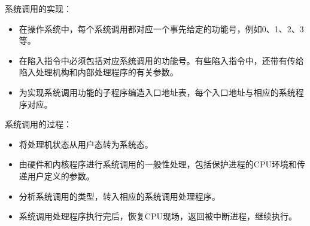 \documentclass[12pt, a4paper, oneside]{ctexart}
\begin{document}
系统调用的实现：
\begin{itemize}
    \item 在操作系统中，每个系统调用都对应一个事先给定的功能号，例如0、1、2、3等。
    \item 在陷入指令中必须包括对应系统调用的功能号。有些陷入指令中，还带有传给陷入处理机构和内部处理程序的有关参数。
    \item 为实现系统调用功能的子程序编造入口地址表，每个入口地址与相应的系统程序对应。
\end{itemize}

系统调用的过程：
\begin{itemize}
    \item 将处理机状态从用户态转为系统态。
    \item 由硬件和内核程序进行系统调用的一般性处理，包括保护进程的CPU环境和传递用户定义的参数。
    \item 分析系统调用的类型，转入相应的系统调用处理程序。
    \item 系统调用处理程序执行完后，恢复CPU现场，返回被中断进程，继续执行。
\end{itemize}
\end{document}
